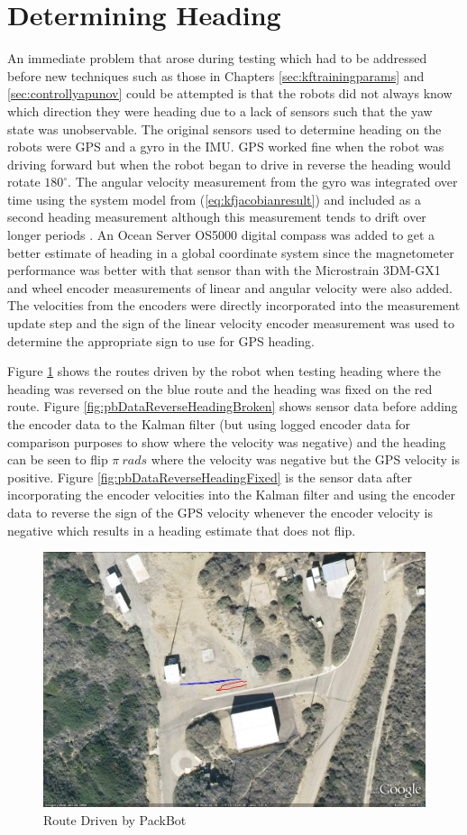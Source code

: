 \section{Determining Heading}
\label{sec:determineHeading}
An immediate problem that arose during testing which had to be addressed before new techniques such as those in Chapters \ref{sec:kftrainingparams} and \ref{sec:controllyapunov} could be attempted is that the robots did not always know which direction they were heading due to a lack of sensors such that the yaw state was unobservable. The original sensors used to determine heading on the robots were GPS and a gyro in the IMU. GPS worked fine when the robot was driving forward but when the robot began to drive in reverse the heading would rotate $180^\circ$. The angular velocity measurement from the gyro was integrated over time using the system model from (\ref{eq:kfjacobianresult}) and included as a second heading measurement although this measurement tends to drift over longer periods \cite{ChungOjeda01}. An Ocean Server OS5000 digital compass was added to get a better estimate of heading in a global coordinate system since the magnetometer performance was better with that sensor than with the Microstrain 3DM-GX1 and wheel encoder measurements of linear and angular velocity were also added. The velocities from the encoders were directly incorporated into the measurement update step and the sign of the linear velocity encoder measurement was used to determine the appropriate sign to use for GPS heading.

Figure \ref{fig:GEHeadingReverse} shows the routes driven by the robot when testing heading where the heading was reversed on the blue route and the heading was fixed on the red route. Figure \ref{fig:pbDataReverseHeadingBroken} shows sensor data before adding the encoder data to the Kalman filter (but using logged encoder data for comparison purposes to show where the velocity was negative) and the heading can be seen to flip $\pi ~ rads$ where the velocity was negative but the GPS velocity is positive. Figure \ref{fig:pbDataReverseHeadingFixed} is the sensor data after incorporating the encoder velocities into the Kalman filter and using the encoder data to reverse the sign of the GPS velocity whenever the encoder velocity is negative which results in a heading estimate that does not flip.

\begin{figure}[ht!]
	\centering
	\includegraphics[width=.7\textwidth]{images/GEHeadingReverseFixed}
	\caption{Route Driven by PackBot}
	\label{fig:GEHeadingReverse}
\end{figure}

